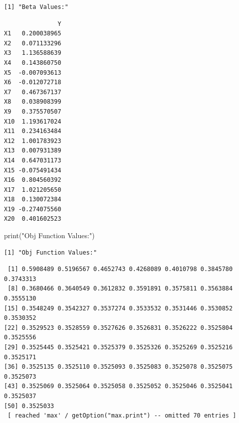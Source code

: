 \documentclass[
  letterpaper,
  DIV=11,
  numbers=noendperiod]{scrartcl}
\newenvironment{Shaded}{\begin{snugshade}}{\end{snugshade}}
\newcommand{\FunctionTok}[1]{\textcolor[rgb]{0.28,0.35,0.67}{#1}}
\newcommand{\NormalTok}[1]{\textcolor[rgb]{0.00,0.23,0.31}{#1}}
\newcommand{\SpecialCharTok}[1]{\textcolor[rgb]{0.37,0.37,0.37}{#1}}
\newcommand{\StringTok}[1]{\textcolor[rgb]{0.13,0.47,0.30}{#1}}
\begin{document}
\begin{verbatim}
[1] "Beta Values:"
\end{verbatim}

\begin{Shaded}
\end{Shaded}

\begin{verbatim}
               Y
X1   0.200038965
X2   0.071133296
X3   1.136588639
X4   0.143860750
X5  -0.007093613
X6  -0.012072718
X7   0.467367137
X8   0.038908399
X9   0.375570507
X10  1.193617024
X11  0.234163484
X12  1.001783923
X13  0.007931389
X14  0.647031173
X15 -0.075491434
X16  0.804560392
X17  1.021205650
X18  0.130072384
X19 -0.274075560
X20  0.401602523
\end{verbatim}

\begin{Shaded}
\begin{Highlighting}[]
\FunctionTok{print}\NormalTok{(}\StringTok{"Obj Function Values:"}\NormalTok{)}
\end{Highlighting}
\end{Shaded}

\begin{verbatim}
[1] "Obj Function Values:"
\end{verbatim}

\begin{Shaded}
\end{Shaded}

\begin{verbatim}
 [1] 0.5908489 0.5196567 0.4652743 0.4268089 0.4010798 0.3845780 0.3743313
 [8] 0.3680466 0.3640549 0.3612832 0.3591891 0.3575811 0.3563884 0.3555130
[15] 0.3548249 0.3542327 0.3537274 0.3533532 0.3531446 0.3530852 0.3530352
[22] 0.3529523 0.3528559 0.3527626 0.3526831 0.3526222 0.3525804 0.3525556
[29] 0.3525445 0.3525421 0.3525379 0.3525326 0.3525269 0.3525216 0.3525171
[36] 0.3525135 0.3525110 0.3525093 0.3525083 0.3525078 0.3525075 0.3525073
[43] 0.3525069 0.3525064 0.3525058 0.3525052 0.3525046 0.3525041 0.3525037
[50] 0.3525033
 [ reached 'max' / getOption("max.print") -- omitted 70 entries ]
\end{verbatim}
\end{document}
